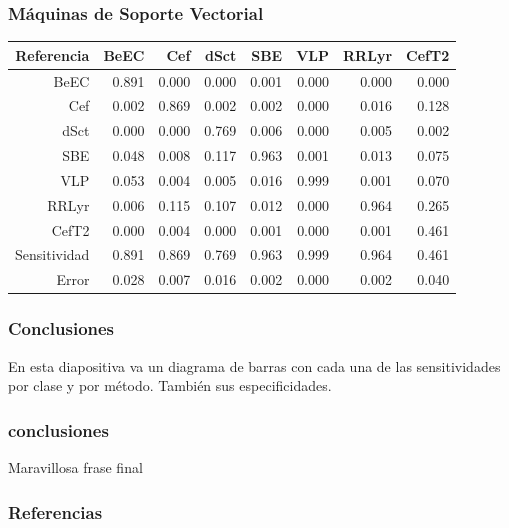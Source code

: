 \documentclass{beamer}
\begin{document}
\begin{frame}
\frametitle{Máquinas de Soporte Vectorial}
  \begin{table}[ht]
    \centering
    \resizebox{0.7\textwidth}{!} {
      \begin{tabular}{rrrrrrrr}
        \hline
        Referencia & BeEC & Cef & dSct & SBE & VLP & RRLyr & CefT2 \\ 
        \hline
        BeEC & 0.891 & 0.000 & 0.000 & 0.001 & 0.000 & 0.000 & 0.000 \\ 
        Cef & 0.002 & 0.869 & 0.002 & 0.002 & 0.000 & 0.016 & 0.128 \\ 
        dSct & 0.000 & 0.000 & 0.769 & 0.006 & 0.000 & 0.005 & 0.002 \\ 
        SBE & 0.048 & 0.008 & 0.117 & 0.963 & 0.001 & 0.013 & 0.075 \\ 
        VLP & 0.053 & 0.004 & 0.005 & 0.016 & 0.999 & 0.001 & 0.070 \\ 
        RRLyr & 0.006 & 0.115 & 0.107 & 0.012 & 0.000 & 0.964 & 0.265 \\ 
        CefT2 & 0.000 & 0.004 & 0.000 & 0.001 & 0.000 & 0.001 & 0.461 \\
        \hline
        \hline
        Sensitividad &  0.891 & 0.869 & 0.769 & 0.963 & 0.999 & 0.964 & 0.461 \\ 
        \hline
        Error & 0.028 & 0.007 & 0.016 & 0.002 & 0.000 & 0.002 & 0.040 \\ 
        \hline
        \hline
      \end{tabular}
    }
  \end{table}
\end{frame}

\begin{frame}
\frametitle{Conclusiones}
En esta diapositiva va un diagrama de barras con cada una de las sensitividades por clase y por método. También sus especificidades.
\end{frame}

\begin{frame}
\frametitle{conclusiones}
Maravillosa frase final
\end{frame}

\begin{frame}[allowframebreaks]
  \frametitle{Referencias}
  
  
\end{frame}
\end{document}
